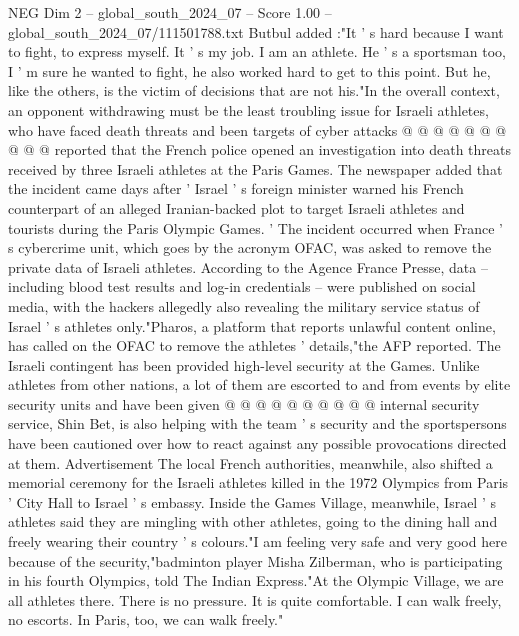 \begin{textsample}{NEG Dim 2 – global\_south\_2024\_07 – Score 1.00 – global\_south\_2024\_07/111501788.txt}
Butbul added :"It ' s hard because I want to fight, to express myself.
It ' s my job.
I am an athlete.
He ' s a sportsman too, I ' m sure he wanted to fight, he also worked hard to get to this point.
But he, like the others, is the victim of decisions that are not his."In the overall context, an opponent withdrawing must be the least troubling issue for Israeli athletes, who have faced death threats and been targets of cyber attacks @ @ @ @ @ @ @ @ @ @ reported that the French police opened an investigation into death threats received by three Israeli athletes at the Paris Games.
The newspaper added that the incident came days after ' Israel ' s foreign minister warned his French counterpart of an alleged Iranian-backed plot to target Israeli athletes and tourists during the Paris Olympic Games. ' The incident occurred when France ' s cybercrime unit, which goes by the acronym OFAC, was asked to remove the private data of Israeli athletes.
According to the Agence France Presse, data -- including blood test results and log-in credentials -- were published on social media, with the hackers allegedly also revealing the military service status of Israel ' s athletes only."Pharos, a platform that reports unlawful content online, has called on the OFAC to remove the athletes ' details,"the AFP reported.
The Israeli contingent has been provided high-level security at the Games.
Unlike athletes from other nations, a lot of them are escorted to and from events by elite security units and have been given @ @ @ @ @ @ @ @ @ @ internal security service, Shin Bet, is also helping with the team ' s security and the sportspersons have been cautioned over how to react against any possible provocations directed at them.
Advertisement The local French authorities, meanwhile, also shifted a memorial ceremony for the Israeli athletes killed in the 1972 Olympics from Paris ' City Hall to Israel ' s embassy.
Inside the Games Village, meanwhile, Israel ' s athletes said they are mingling with other athletes, going to the dining hall and freely wearing their country ' s colours."I am feeling very safe and very good here because of the security,"badminton player Misha Zilberman, who is participating in his fourth Olympics, told The Indian Express."At the Olympic Village, we are all athletes there.
There is no pressure.
It is quite comfortable.
I can walk freely, no escorts.
In Paris, too, we can walk freely."

\end{textsample}
